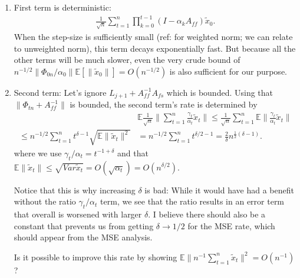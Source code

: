\begin{enumerate}
    \item First term is deterministic:
    \begin{align*}
        \frac{1}{\sqrt{n}} \sum_{t=1}^n \prod_{k=0}^{t-1}(I - \alpha_k A_{ff}) \tilde{x}_0 .
    \end{align*}
    When the step-size is sufficiently small ({\color{red}ref: \citet{kaledin2020finite} for weighted norm; we can relate to unweighted norm}), this term decays exponentially fast.    
    But because all the other terms will be much slower, even the very crude bound of
    $n^{-1/2} \lVert \Phi_{0n}/\alpha_0 \rVert \mathbb{E}[\lVert \tilde{x}_0\rVert] = O(n^{-1/2})$ is also sufficient for our purpose.
    
    \item Second term: Let's ignore $L_{j+1} + A_{ff}^{-1} A_{fs}$ which is bounded. 
    Using that $\lVert \Phi_{tn} + A_{ff}^{-1} \rVert$ is bounded, the second term's rate is determined by 
    \begin{align*}
        &\mathbb{E} \frac{1}{\sqrt{n}} \lVert \sum_{t=1}^n \frac{\gamma_t}{\alpha_t}  \tilde{x}_t \rVert 
        \leq \frac{1}{\sqrt{n}} \sum_{t=1}^n \mathbb{E} \lVert \frac{\gamma_t}{\alpha_t} \tilde{x}_t \rVert 
        \\
        \leq
        n^{-1/2} \sum_{t=1}^n t^{\delta - 1} \sqrt{\mathbb{E} \lVert \tilde{x}_t \rVert^2}
        &= n^{-1/2} \sum_{t=1}^n t^{\delta/2 - 1}
        = \frac{2}{\delta} n^{\frac{1}{2}(\delta - 1)} .
    \end{align*}
    where we use $\gamma_t/\alpha_t = t^{-1 + \delta}$ and that $\mathbb{E}\lVert \tilde{x}_t \rVert \leq \sqrt{Var \tilde{x}_t} = O(\sqrt{\alpha_t}) = O(n^{\delta/2})$.

    
    {\color{red}
    Notice that this is why increasing $\delta$ is bad: While it would have had a benefit without the ratio $\gamma_t / \alpha_t$ term, we see that the ratio results in an error term that overall is worsened with larger $\delta$.
    I believe there should also be a constant that prevents us from getting $\delta \to 1/2$ for the MSE rate, which should appear from the \citep{konda2004convergence} MSE analysis. 
    }

    {\color{blue}Is it possible to improve this rate by showing $\mathbb{E}\lVert n^{-1} \sum_{t=1}^n \tilde{x}_t \rVert^2 = O(n^{-1})$?}
    

\end{enumerate}
